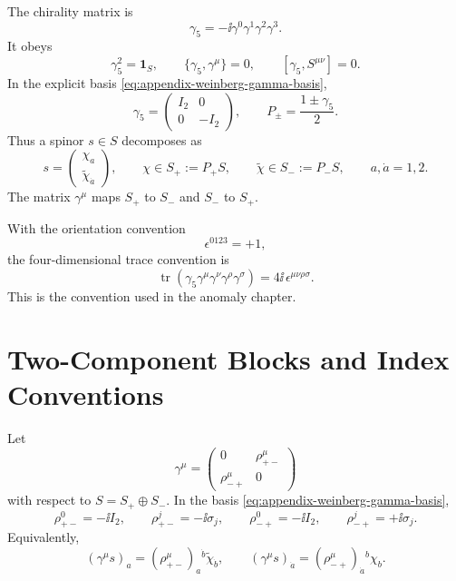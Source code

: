 The chirality matrix is
\begin{equation}
  \gamma_5=-\ii\gamma^0\gamma^1\gamma^2\gamma^3 .
  \label{eq:appendix-gamma-five}
\end{equation}
It obeys
\[
  \gamma_5^2=\mathbf 1_S,
  \qquad
  \{\gamma_5,\gamma^\mu\}=0,
  \qquad
  [\gamma_5,S^{\mu\nu}]=0 .
\]
In the explicit basis \eqref{eq:appendix-weinberg-gamma-basis},
\[
  \gamma_5=
  \begin{pmatrix}
    I_2&0\\0&-I_2
  \end{pmatrix},
  \qquad
  P_\pm=\frac{1\pm\gamma_5}{2}.
\]
Thus a spinor \(s\in S\) decomposes as
\[
  s=
  \begin{pmatrix}\chi_a\\ \widetilde\chi_{\dot a}\end{pmatrix},
  \qquad
  \chi\in S_+:=P_+S,
  \qquad
  \widetilde\chi\in S_-:=P_-S,
  \qquad
  a,\dot a=1,2 .
\]
The matrix \(\gamma^\mu\) maps \(S_+\) to \(S_-\) and \(S_-\) to \(S_+\).

With the orientation convention
\[
  \epsilon^{0123}=+1,
\]
the four-dimensional trace convention is
\begin{equation}
  \operatorname{tr}
  \left(\gamma_5\gamma^\mu\gamma^\nu\gamma^\rho\gamma^\sigma\right)
  =
  4\ii\,\epsilon^{\mu\nu\rho\sigma}.
  \label{eq:appendix-gamma-five-trace}
\end{equation}
This is the convention used in the anomaly chapter.

\section{Two-Component Blocks and Index Conventions}

Let
\[
  \gamma^\mu
  =
  \begin{pmatrix}
    0&\rho^\mu_{+-}\\
    \rho^\mu_{-+}&0
  \end{pmatrix}
\]
with respect to \(S=S_+\oplus S_-\).  In the basis
\eqref{eq:appendix-weinberg-gamma-basis},
\[
  \rho^0_{+-}=-\ii I_2,
  \qquad
  \rho^j_{+-}=-\ii\sigma_j,
  \qquad
  \rho^0_{-+}=-\ii I_2,
  \qquad
  \rho^j_{-+}=+\ii\sigma_j .
\]
Equivalently,
\[
  (\gamma^\mu s)_a=(\rho^\mu_{+-})_a{}^{\dot b}
  \widetilde\chi_{\dot b},
  \qquad
  (\gamma^\mu s)_{\dot a}=(\rho^\mu_{-+})_{\dot a}{}^b\chi_b .
\]

